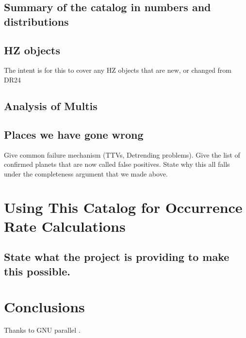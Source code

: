 \documentclass[apj,twocolappendix,numberedappendix]{emulateapj}
\renewcommand{\_}{\discretionary{\underscore}{}{\underscore}}  %
\begin{document}
\subsection{Summary of the catalog in numbers and distributions}


\subsection{HZ objects}
The intent is for this to cover any HZ objects that are new, or changed from DR24

\subsection{Analysis of Multis}

\subsection{Places we have gone wrong}
Give common failure mechanism (TTVs, Detrending problems).  Give the list of confirmed planets that are now called false positives.  State why this all falls under the completeness argument that we made above.

\section{Using This Catalog for Occurrence Rate Calculations}
\subsection{State what the project is providing to make this possible.}


\section{Conclusions}

\acknowledgments
Thanks to GNU parallel \citep{Tange2011a}.


%



\clearpage
\tableofcontents
\end{document}
